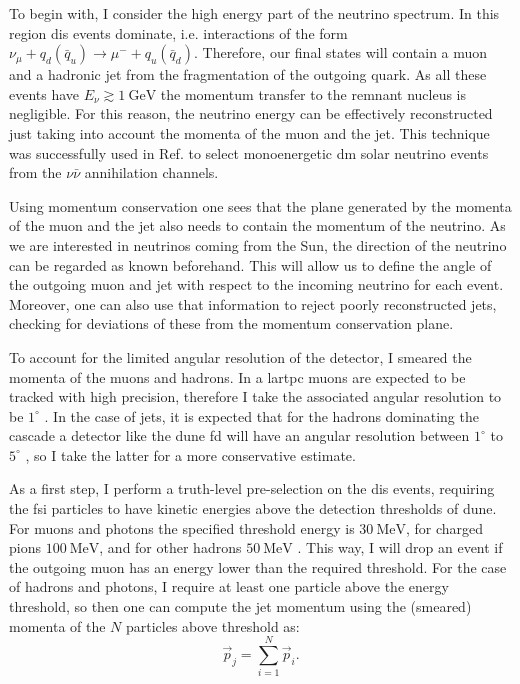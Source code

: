 To begin with, I consider the high energy part of the neutrino spectrum. In this region \gls{dis} events dominate, i.e. interactions of the form $\nu_{\mu} + q_{d}(\bar{q}_{u}) \rightarrow \mu^{-} + q_{u}(\bar{q}_{d})$. Therefore, our final states will contain a muon and a hadronic jet from the fragmentation of the outgoing quark. As all these events have $E_{\nu} \gtrsim 1 \ \mathrm{GeV}$ the momentum transfer to the remnant nucleus is negligible. For this reason, the neutrino energy can be effectively reconstructed just taking into account the momenta of the muon and the jet. This technique was successfully used in Ref. \cite{Rott2019} to select monoenergetic \gls{dm} solar neutrino events from the $\nu \bar{\nu}$ annihilation channels.

Using momentum conservation one sees that the plane generated by the momenta of the muon and the jet also needs to contain the momentum of the neutrino. As we are interested in neutrinos coming from the Sun, the direction of the neutrino can be regarded as known beforehand. This will allow us to define the angle of the outgoing muon and jet with respect to the incoming neutrino for each event. Moreover, one can also use that information to reject poorly reconstructed jets, checking for deviations of these from the momentum conservation plane.

To account for the limited angular resolution of the detector, I smeared the momenta of the muons and hadrons. In a \gls{lartpc} muons are expected to be tracked with high precision, therefore I take the associated angular resolution to be $1^{\circ}$ \cite{DUNE2020TDR2}. In the case of jets, it is expected that for the hadrons dominating the cascade a detector like the \gls{dune} \gls{fd} will have an angular resolution between $1^{\circ}$ to $5^{\circ}$ \cite{DUNE2020TDR2}, so I take the latter for a more conservative estimate.

As a first step, I perform a truth-level pre-selection on the \gls{dis} events, requiring the \gls{fsi} particles to have kinetic energies above the detection thresholds of \gls{dune}. For muons and photons the specified threshold energy is $30 ~ \mathrm{MeV}$, for charged pions $100 ~ \mathrm{MeV}$, and for other hadrons $50 ~ \mathrm{MeV}$ \cite{DUNE2020TDR2}. This way, I will drop an event if the outgoing muon has an energy lower than the required threshold. For the case of hadrons and photons, I require at least one particle above the energy threshold, so then one can compute the jet momentum using the (smeared) momenta of the $N$ particles above threshold as:
\begin{equation}
	\vec{p}_{j} = \sum_{i=1}^{N} \vec{p}_{i}.
\end{equation}

